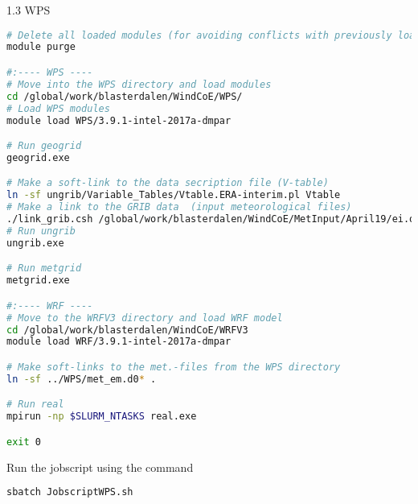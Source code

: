 \documentclass[xcolor=table]{beamer}
\begin{document}
\begin{frame}[fragile, allowframebreaks=.95, t]{1.3 WPS}
\begin{lstlisting}[backgroundcolor = \color{light-gray}, language=bash]
# Delete all loaded modules (for avoiding conflicts with previously loaded modules)
module purge

#:---- WPS ----
# Move into the WPS directory and load modules
cd /global/work/blasterdalen/WindCoE/WPS/
# Load WPS modules 
module load WPS/3.9.1-intel-2017a-dmpar

# Run geogrid
geogrid.exe

# Make a soft-link to the data secription file (V-table)
ln -sf ungrib/Variable_Tables/Vtable.ERA-interim.pl Vtable
# Make a link to the GRIB data  (input meteorological files)
./link_grib.csh /global/work/blasterdalen/WindCoE/MetInput/April19/ei.oper*
# Run ungrib
ungrib.exe

# Run metgrid
metgrid.exe

#:---- WRF ----
# Move to the WRFV3 directory and load WRF model
cd /global/work/blasterdalen/WindCoE/WRFV3
module load WRF/3.9.1-intel-2017a-dmpar

# Make soft-links to the met.-files from the WPS directory
ln -sf ../WPS/met_em.d0* .

# Run real
mpirun -np $SLURM_NTASKS real.exe

exit 0
\end{lstlisting}

Run the jobscript using the command 
\begin{lstlisting}[backgroundcolor = \color{light-gray}, language=bash]
	sbatch JobscriptWPS.sh
\end{lstlisting}
\end{frame}
\end{document}

